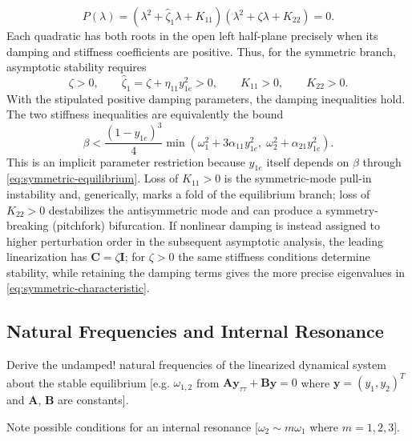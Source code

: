\documentclass[11pt]{article}
\newenvironment{assignmentinstruction}{\par\begingroup\color{blue}}{\par\endgroup}
\begin{document}
\begin{equation}\label{eq:symmetric-characteristic}
P(\lambda)=(\lambda^2+\hat{\zeta}_1\lambda+K_{11})(\lambda^2+\zeta\lambda+K_{22})=0.
\end{equation}
Each quadratic has both roots in the open left half-plane precisely when its damping and stiffness coefficients are positive. Thus, for the symmetric branch, asymptotic stability requires
\begin{equation}\label{eq:stability-conditions}
\zeta>0,\qquad \hat{\zeta}_1=\zeta+\eta_{11}y_{1e}^2>0,\qquad K_{11}>0,\qquad K_{22}>0.
\end{equation}
With the stipulated positive damping parameters, the damping inequalities hold. The two stiffness inequalities are equivalently the bound
\begin{equation}\label{eq:beta-stability-bound}
\beta<\frac{(1-y_{1e})^3}{4}\min\!\left(\omega_1^2+3\alpha_{11}y_{1e}^2,\;\omega_2^2+\alpha_{21}y_{1e}^2\right).
\end{equation}
This is an implicit parameter restriction because $y_{1e}$ itself depends on $\beta$ through \eqref{eq:symmetric-equilibrium}. Loss of $K_{11}>0$ is the symmetric-mode pull-in instability and, generically, marks a fold of the equilibrium branch; loss of $K_{22}>0$ destabilizes the antisymmetric mode and can produce a symmetry-breaking (pitchfork) bifurcation. If nonlinear damping is instead assigned to higher perturbation order in the subsequent asymptotic analysis, the leading linearization has $\mathbf{C}=\zeta\mathbf{I}$; for $\zeta>0$ the same stiffness conditions determine stability, while retaining the damping terms gives the more precise eigenvalues in \eqref{eq:symmetric-characteristic}.

\subsection{Natural Frequencies and Internal Resonance}
\begin{assignmentinstruction}
Derive the undamped! natural frequencies of the linearized dynamical system about the stable equilibrium [e.g. $\omega_{1,2}$ from $\mathbf{A}\mathbf{y}_{\tau\tau}+\mathbf{B}\mathbf{y}=0$ where $\mathbf{y}=(y_1,y_2)^T$ and $\mathbf{A}$, $\mathbf{B}$ are constants].

Note possible conditions for an internal resonance [$\omega_2\sim m\omega_1$ where $m=1,2,3$].
\end{assignmentinstruction}
\end{document}
